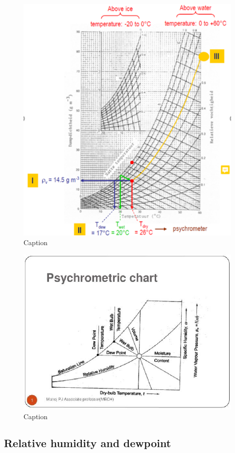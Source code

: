 \documentclass[12pt,oneside]{book}
\begin{document}
\begin{figure}

{\centering \includegraphics[width=0.9\linewidth]{figures/Figure233} 

}

\caption{Caption}\label{fig:Mollier}
\end{figure}

\begin{figure}

{\centering \includegraphics[width=0.6\linewidth]{figures/Figure234} 

}

\caption{Caption}\label{fig:Mollier2}
\end{figure}

\subsection{Relative humidity and
dewpoint}\label{relative-humidity-and-dewpoint}
\end{document}
